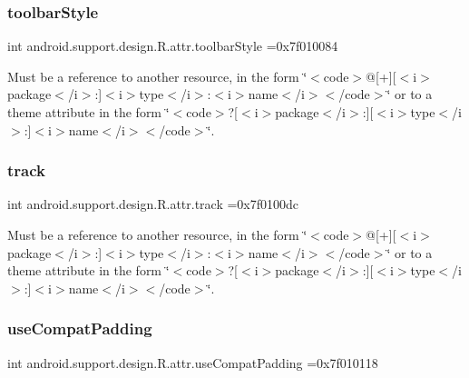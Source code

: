 \subsubsection{\texorpdfstring{toolbar\+Style}{toolbarStyle}}
{\footnotesize\ttfamily int android.\+support.\+design.\+R.\+attr.\+toolbar\+Style =0x7f010084\hspace{0.3cm}{\ttfamily [static]}}

Must be a reference to another resource, in the form \char`\"{}$<$code$>$@\mbox{[}+\mbox{]}\mbox{[}$<$i$>$package$<$/i$>$\+:\mbox{]}$<$i$>$type$<$/i$>$\+:$<$i$>$name$<$/i$>$$<$/code$>$\char`\"{} or to a theme attribute in the form \char`\"{}$<$code$>$?\mbox{[}$<$i$>$package$<$/i$>$\+:\mbox{]}\mbox{[}$<$i$>$type$<$/i$>$\+:\mbox{]}$<$i$>$name$<$/i$>$$<$/code$>$\char`\"{}. \mbox{\label{classandroid_1_1support_1_1design_1_1R_1_1attr_ad467d29a4423787673806b6d2ec0a48e}} 
\subsubsection{\texorpdfstring{track}{track}}
{\footnotesize\ttfamily int android.\+support.\+design.\+R.\+attr.\+track =0x7f0100dc\hspace{0.3cm}{\ttfamily [static]}}

Must be a reference to another resource, in the form \char`\"{}$<$code$>$@\mbox{[}+\mbox{]}\mbox{[}$<$i$>$package$<$/i$>$\+:\mbox{]}$<$i$>$type$<$/i$>$\+:$<$i$>$name$<$/i$>$$<$/code$>$\char`\"{} or to a theme attribute in the form \char`\"{}$<$code$>$?\mbox{[}$<$i$>$package$<$/i$>$\+:\mbox{]}\mbox{[}$<$i$>$type$<$/i$>$\+:\mbox{]}$<$i$>$name$<$/i$>$$<$/code$>$\char`\"{}. \mbox{\label{classandroid_1_1support_1_1design_1_1R_1_1attr_ae9972f9c82bd89aa3af6cc62b3939ecd}} 
\subsubsection{\texorpdfstring{use\+Compat\+Padding}{useCompatPadding}}
{\footnotesize\ttfamily int android.\+support.\+design.\+R.\+attr.\+use\+Compat\+Padding =0x7f010118\hspace{0.3cm}{\ttfamily [static]}}

